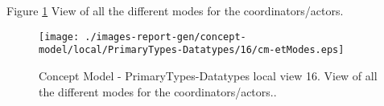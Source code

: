 Figure \ref{fig:lu.uni.lassy.excalibur.group09.spec-CM-view-local-PrimaryTypes-Datatypes-16} View of all the different modes for the coordinators/actors.



\begin{figure}[htbp] 
\label{fig:lu.uni.lassy.excalibur.group09.spec-CM}
\begin{center}
\texttt{[image: ./images-report-gen/concept-model/local/PrimaryTypes-Datatypes/16/cm-etModes.eps]}
\end{center}
\caption[Concept Model - PrimaryTypes-Datatypes local view 16 - View of all the different modes for ]{Concept Model - PrimaryTypes-Datatypes local view 16. View of all the different modes for the coordinators/actors..}
\label{fig:lu.uni.lassy.excalibur.group09.spec-CM-view-local-PrimaryTypes-Datatypes-16}
\end{figure}
\vspace{0.5cm} 
